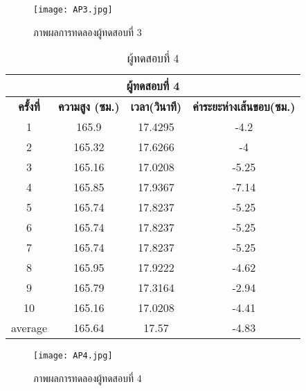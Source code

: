 \begin{figure}[!ht]
\centering
\texttt{[image: AP3.jpg]}
\caption{ภาพผลการทดลองผู้ทดสอบที่ 3 }
\label{fig:AP3.jpg}
\end{figure}


\begin{table}[!hb] 
\centering
\caption{ผู้ทดสอบที่ 4}
\label{tab:4}
\begin{tabular}{|c|c|c|c|}
\hline
\multicolumn{4}{|c|}{\textbf{ผู้ทดสอบที่ 4}}    \\ \hline
\textbf{ครั้งที่} & \textbf{ความสูง (ซม.)} & \textbf{เวลา(วินาที)} & \textbf{ค่าระยะห่างเส้นขอบ(ซม.)} \\ \hline
1       & 165.9  & 17.4295 & -4.2 \\ \hline
2       & 165.32 & 17.6266 & -4    \\ \hline
3       & 165.16 & 17.0208 & -5.25     \\ \hline
4       & 165.85 & 17.9367 & -7.14    \\ \hline
5       & 165.74 & 17.8237 & -5.25    \\ \hline
6       & 165.74 & 17.8237 & -5.25  \\ \hline
7       & 165.74 & 17.8237 & -5.25      \\ \hline
8       & 165.95 & 17.9222 & -4.62   \\ \hline
9       & 165.79 & 17.3164 & -2.94     \\ \hline
10      & 165.16 & 17.0208 & -4.41     \\ \hline
average & 165.64 & 17.57   & -4.83    \\ \hline
\end{tabular}
\end{table}

\begin{figure}[!ht]
\centering
\texttt{[image: AP4.jpg]}
\caption{ภาพผลการทดลองผู้ทดสอบที่ 4 }
\label{fig:AP4.jpg}
\end{figure}


